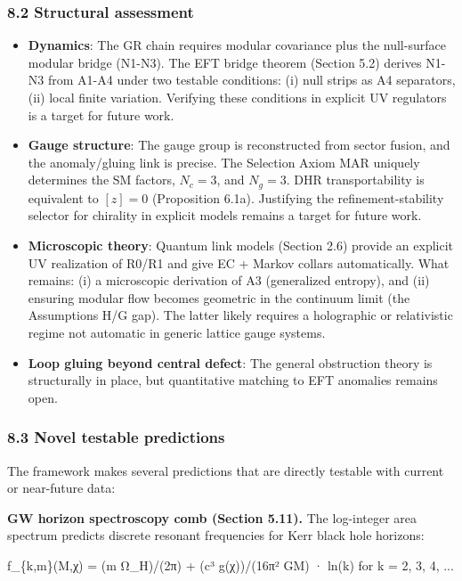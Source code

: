 \subsubsection{8.2 Structural assessment}\label{82-structural-assessment}

\begin{itemize}
\tightlist
\item
  \textbf{Dynamics}: The GR chain requires modular covariance plus the null-surface modular bridge (N1-N3). The EFT bridge theorem (Section 5.2) derives N1-N3 from A1-A4 under two testable conditions: (i) null strips as A4 separators, (ii) local finite variation. Verifying these conditions in explicit UV regulators is a target for future work.
\item
  \textbf{Gauge structure}: The gauge group is reconstructed from sector fusion, and the anomaly/gluing link is precise. The Selection Axiom MAR uniquely determines the SM factors, \(N_c = 3\), and \(N_g = 3\). DHR transportability is equivalent to \([z]=0\) (Proposition 6.1a). Justifying the refinement-stability selector for chirality in explicit models remains a target for future work.
\item
  \textbf{Microscopic theory}: Quantum link models (Section 2.6) provide an explicit UV realization of R0/R1 and give EC + Markov collars automatically. What remains: (i) a microscopic derivation of A3 (generalized entropy), and (ii) ensuring modular flow becomes geometric in the continuum limit (the Assumptions H/G gap). The latter likely requires a holographic or relativistic regime not automatic in generic lattice gauge systems.
\item
  \textbf{Loop gluing beyond central defect}: The general obstruction theory is structurally in place, but quantitative matching to EFT anomalies remains open.
\end{itemize}

\subsubsection{8.3 Novel testable predictions}\label{83-novel-testable-predictions}

The framework makes several predictions that are directly testable with current or near-future data:

\textbf{GW horizon spectroscopy comb (Section 5.11).} The log-integer area spectrum predicts discrete resonant frequencies for Kerr black hole horizons:

f\_\{k,m\}(M,χ) = (m Ω\_H)/(2π) + (c³ g(χ))/(16π² GM) · ln(k) for k = 2, 3, 4, ...

